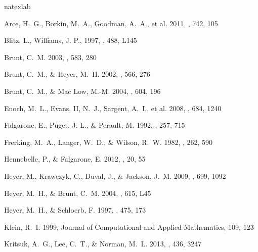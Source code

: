 \documentclass[iop,revtex4]{emulateapj}
\begin{document}
%

\begin{thebibliography}{40}
\expandafter\ifx\csname natexlab\endcsname\relax\def\natexlab#1{#1}\fi

{Arce}, H.~G., {Borkin}, M.~A., {Goodman}, A.~A., et al. 2011, \apj, 742, 105

{Blitz}, L., {Williams}, J. P., 1997, \apj, 488, L145

{Brunt}, C.~M. 2003, \apj, 583, 280

{Brunt}, C.~M., \& {Heyer}, M.~H. 2002, \apj, 566, 276

{Brunt}, C.~M., \& {Mac Low}, M.-M. 2004, \apj, 604, 196

{Enoch}, M.~L., {Evans}, II, N.~J., {Sargent}, A.~I., et al. 2008, \apj, 684, 1240

{Falgarone}, E., {Puget}, J.-L., \& {Perault}, M. 1992, \aap, 257, 715

{Frerking}, M.~A., {Langer}, W.~D., \& {Wilson}, R.~W. 1982, \apj, 262, 590

{Hennebelle}, P., \& {Falgarone}, E. 2012, \aapr, 20, 55

{Heyer}, M., {Krawczyk}, C., {Duval}, J., \& {Jackson}, J.~M. 2009, \apj, 699,
  1092

{Heyer}, M.~H., \& {Brunt}, C.~M. 2004, \apjl, 615, L45

{Heyer}, M.~H., \& {Schloerb}, F. 1997, \apj, 475, 173

{Klein}, R.~I. 1999, Journal of Computational and Applied Mathematics, 109, 123

{Kritsuk}, A.~G., {Lee}, C.~T., \& {Norman}, M.~L. 2013, \mnras, 436, 3247


\end{thebibliography}
\end{document}
